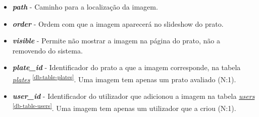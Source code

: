 \documentclass[11pt, a4paper, sans]{article}
\begin{document}
	\begin{itemize}
		\item \textbf{\textit{path}} - Caminho para a localização da imagem.
		\item \textbf{\textit{order}} - Ordem com que a imagem aparecerá no slideshow do prato.
		\item \textbf{\textit{visible}} - Permite não mostrar a imagem na página do prato, não a removendo do sistema.		
		\item \textbf{\textit{plate\_id}} - Identificador do prato a que a imagem corresponde, na tabela 
		\underline{\textit{plates}} \textsuperscript{\ref{db-table-plates}}. 
		Uma imagem tem apenas um prato avaliado (N:1).
		\item \textbf{\textit{user\_id}} - Identificador do utilizador que adicionou a imagem na tabela 
		\underline{\textit{users}} \textsuperscript{\ref{db-table-users}}.
		Uma imagem tem apenas um utilizador que a criou (N:1).
	\end{itemize}
\end{document}
